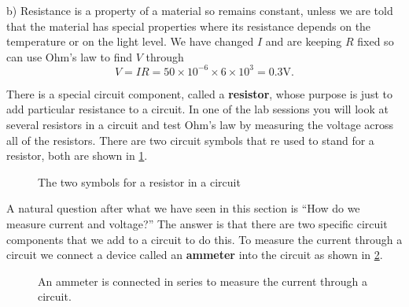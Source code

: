 \documentclass[a4paper,12pt]{book}
\begin{document}
b) Resistance is a property of a material so remains constant, unless we are told that the material has special properties where its resistance depends on the temperature or on the light level. We have changed $I$ and are keeping $R$ fixed so can use Ohm's law to find $V$ through
\begin{equation*}
V=IR=50\times10^{-6}\times 6\times 10^{3}=0.3\text{V}.
\end{equation*}


There is a special circuit component, called a \textbf{resistor}, whose purpose is just to add particular resistance to a circuit. In one of the lab sessions you will look at several resistors in a circuit and test Ohm's law by measuring the voltage across all of the resistors.  There are two circuit symbols that re used to stand for a resistor, both are shown in \cref{fig: resistors}.

\begin{figure}[ht]
    \centering
    \caption{The two symbols for a resistor in a circuit}
    \label{fig: resistors}
\end{figure}

A natural question after what we have seen in this section is ``How do we measure current and voltage?'' The answer is that there are two specific circuit components that we add to a circuit to do this. To measure the current through a circuit we connect a device called an \textbf{ammeter} into the circuit as shown in \cref{fig: ammeter}.

\begin{figure}[ht]
    \centering
    \caption{An ammeter is connected in series to measure the current through a circuit.}
    \label{fig: ammeter}
\end{figure}
\end{document}
